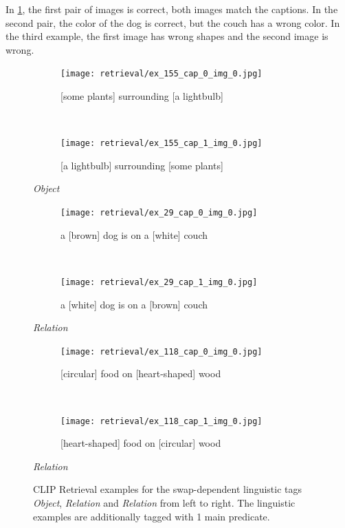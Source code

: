 In \cref{fig:retrieval-examples}, the first pair of images is correct, both images match the captions. In the second pair, the color of the dog is correct, but the couch has a wrong color. In the third example, the first image has wrong shapes and the second image is wrong.

\begin{figure}[ht]
\centering
    \begin{minipage}[t]{.30\textwidth}
        \begin{subfigure}[t]{\textwidth}
        \centering
        \texttt{[image: retrieval/ex\_155\_cap\_0\_img\_0.jpg]}
        \caption{[some plants] surrounding [a lightbulb]}
        \end{subfigure}\\
        \begin{subfigure}[t]{\textwidth}
        \centering
        \texttt{[image: retrieval/ex\_155\_cap\_1\_img\_0.jpg]}
        \caption{[a lightbulb] surrounding [some plants]}
        \end{subfigure}%
        \caption*{\textit{Object}}
    \end{minipage}
    \hfill
    \begin{minipage}[t]{.30\textwidth}
        \begin{subfigure}[t]{\textwidth}
        \centering
        \texttt{[image: retrieval/ex\_29\_cap\_0\_img\_0.jpg]}
        \caption{a [brown] dog is on a [white] couch}
        \end{subfigure}\\
        \vspace{10pt}
        \begin{subfigure}[t]{\textwidth}
        \centering
        \texttt{[image: retrieval/ex\_29\_cap\_1\_img\_0.jpg]}
        \caption{a [white] dog is on a [brown] couch}
        \end{subfigure}%
        \vspace{10pt}
        \caption*{\textit{Relation}}
    \end{minipage}
    \hfill
    \begin{minipage}[t]{.30\textwidth}
        \begin{subfigure}[t]{\textwidth}
        \centering
        \texttt{[image: retrieval/ex\_118\_cap\_0\_img\_0.jpg]}
        \caption{[circular] food on [heart-shaped] wood}
        \end{subfigure}\\
        \begin{subfigure}[t]{\textwidth}
        \centering
        \texttt{[image: retrieval/ex\_118\_cap\_1\_img\_0.jpg]}
        \caption{[heart-shaped] food on [circular] wood}
        \end{subfigure}%
        \caption*{\textit{Relation}}
    \end{minipage}%
    \caption{CLIP Retrieval examples for the swap-dependent linguistic tags \textit{Object}, \textit{Relation} and \textit{Relation} from left to right. The linguistic examples are additionally tagged with 1 main predicate.}
    \label{fig:retrieval-examples}
\end{figure}

